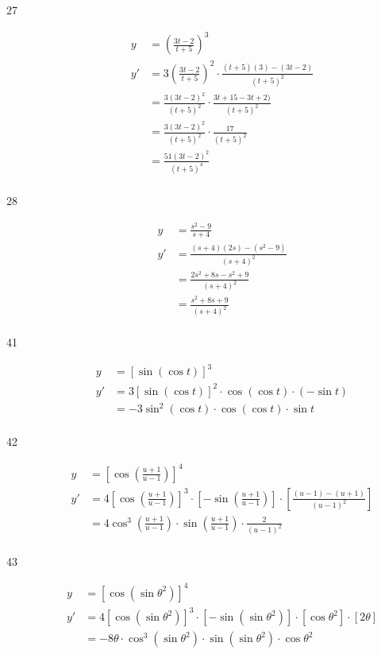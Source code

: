 \documentclass{exam}
\begin{document}
\begin{description}
\item[27]
\begin{align*}
  y  &= \left( \frac{3t - 2}{t + 5} \right)^3 \\
  y' &= 3 \left( \frac{3t - 2}{t + 5} \right)^2 \cdot \frac{(t + 5)(3) - (3t - 2)}{(t+5)^2}  \\
     &= \frac{3(3t - 2)^2}{(t + 5)^2} \cdot \frac{3t + 15 - 3t + 2)}{(t+5)^2}  \\
     &= \frac{3(3t - 2)^2}{(t + 5)^2} \cdot \frac{17}{(t+5)^2} \\
     &= \frac{51(3t - 2)^2}{(t + 5)^4} \\
\end{align*}

\item[28]
\begin{align*}
  y  &= \frac{s^2 - 9}{s + 4} \\
  y' &= \frac{(s+4)(2s) - (s^2 - 9)}{(s + 4)^2} \\
     &= \frac{2s^2 + 8s - s^2 + 9}{(s + 4)^2} \\
     &= \frac{s^2 + 8s + 9}{(s + 4)^2} \\
\end{align*}

\item[41]
\begin{align*}
  y  &= [ \sin(\cos t) ]^3 \\
  y' &= 3 [ \sin (\cos t) ]^2 \cdot \cos (\cos t) \cdot (- \sin t) \\
     &= -3 \sin^2(\cos t) \cdot \cos (\cos t) \cdot \sin t \\
\end{align*}

\item[42]
\begin{align*}
  y  &= \left[ \cos \left( \frac{u+1}{u-1} \right) \right]^4 \\
  y' &= 4 \left[ \cos \left( \frac{u+1}{u-1} \right) \right]^3 \cdot \left[ -\sin \left( \frac{u+1}{u-1} \right) \right] 
        \cdot \left[ \frac{(u-1) - (u+1)}{(u-1)^2} \right] \\
     &= 4 \cos^3 \left( \frac{u+1}{u-1} \right) \cdot \sin \left( \frac{u+1}{u-1} \right) \cdot \frac{2}{(u-1)^2} \\
\end{align*}

\item[43]
\begin{align*}
  y  &= [ \cos(\sin \theta^2 ) ]^4 \\
  y' &= 4 [ \cos(\sin \theta^2 ) ]^3 \cdot [ -\sin(\sin \theta^2 ) ] \cdot [ \cos \theta^2 ] \cdot [2 \theta ] \\
     &= -8 \theta \cdot \cos^3(\sin \theta^2) \cdot \sin(\sin \theta^2 ) \cdot \cos \theta^2 \\
\end{align*}


\end{description}
\end{document}

